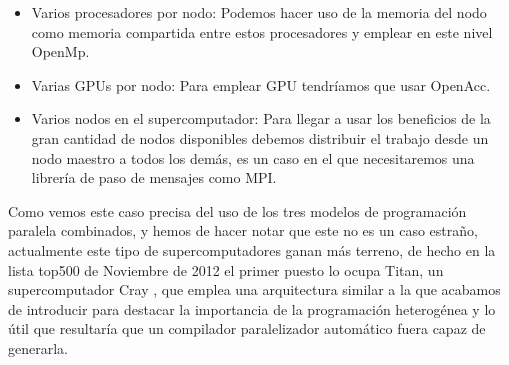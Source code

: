 \begin{itemize}

\item Varios procesadores por nodo: Podemos hacer uso de la memoria del nodo como memoria compartida entre estos procesadores y emplear en este nivel OpenMp.

\item Varias GPUs por nodo: Para emplear GPU tendríamos que usar OpenAcc.

\item Varios nodos en el supercomputador: Para llegar a usar los beneficios de la gran cantidad de nodos disponibles debemos distribuir el trabajo desde un nodo maestro a todos los demás, es un caso en el que necesitaremos una librería de paso de mensajes como MPI.

\end{itemize}

Como vemos este caso precisa del uso de los tres modelos de programación paralela combinados, y hemos de hacer notar que este no es un caso estraño, actualmente este tipo de supercomputadores ganan más terreno, de hecho en la lista top500 de Noviembre de 2012 el primer puesto lo ocupa Titan, un supercomputador Cray , que emplea una arquitectura similar a la que acabamos de introducir para destacar la importancia de la programación heterogénea y lo útil que resultaría que un compilador paralelizador automático fuera capaz de generarla.


